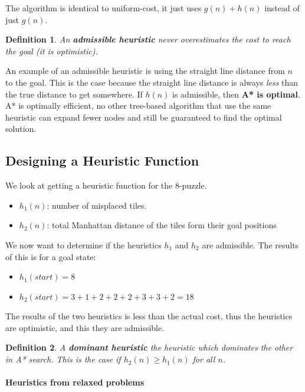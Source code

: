 \documentclass{article}
\newtheorem{definition}{Definition}[section]
\begin{document}
The algorithm is identical to uniform-cost, it just uses $g(n) + h(n)$ instead
of just $g(n)$\cite[p. 93]{book:artificial_intelligence_modern_approach}.

\begin{definition}
  An \textbf{admissible heuristic} never overestimates the cost to reach the
  goal (it is optimistic). 
\end{definition}
An example of an admissible heuristic is using the straight line distance from
$n$ to the goal. This is the case because the straight line distance is always
\emph{less} than the true distance to get somewhere. If $h(n)$ is admissible,
then \textbf{A* is optimal}\cite[p. 21]{presentation:informed_search}.
A* is optimally efficient, no other tree-based algorithm that use the same
heuristic can expand fewer nodes and still be guaranteed to find the optimal
solution.

\subsection{Designing a Heuristic Function}%
\label{sub:designing_a_heuristic_function}

We look at getting a heuristic function for the 8-puzzle.
\begin{itemize}
  \item $h_1(n)$: number of misplaced tiles.
  \item $h_2(n)$: total Manhattan distance of the tiles form their goal
    positions
\end{itemize}

We now want to determine if the heuristics $h_1$ and $h_2$ are admissible. The
results of this is for a goal state:
\begin{itemize}
  \item $h_1(start) = 8$
  \item $h_2(start) = 3+1+2+2+2+3+3+2 = 18$
\end{itemize}

The results of the two heuristics is less than the actual cost, thus the
heuristics are optimistic, and this they are admissible.

\begin{definition}
  A \textbf{dominant heuristic} the heuristic which dominates the other in A*
  search. This is the case if $h_2(n) \geq h_1(n)$ for all $n$.
\end{definition}

\paragraph{Heuristics from relaxed problems}%
\label{par:heuristics_from_relaxed_problems}
\end{document}
